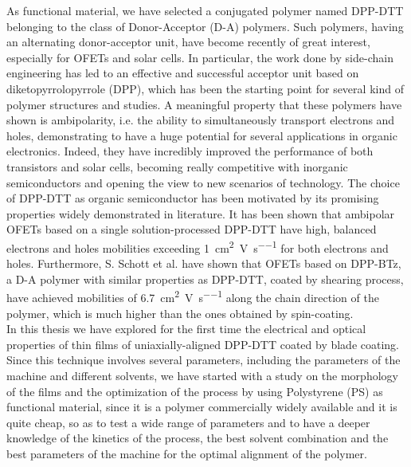 \documentclass  [
  paper    = a4,
  BCOR     = 10mm,
  twoside,
  fontsize = 12pt,
  fleqn,
  toc      = bibnumbered,
  toc      = listofnumbered,
  numbers  = noendperiod,
  headings = normal,
  listof   = leveldown,
  version  = 3.03
]                                       {scrreprt}
\begin{document}
As functional material, we have selected a conjugated polymer named DPP-DTT belonging to the class of Donor-Acceptor (D-A) polymers. Such polymers, having an alternating donor-acceptor unit, have become recently of great interest, especially for OFETs and solar cells. In particular, the work done by side-chain engineering has led to an effective and successful acceptor unit based on diketopyrrolopyrrole (DPP), which has been the starting point for several kind of polymer structures and studies\cite{art:DA}. A meaningful property that these polymers have shown is ambipolarity, i.e. the ability to simultaneously transport electrons and holes, demonstrating to have a huge potential for several applications in organic electronics. Indeed, they have incredibly improved the performance of both transistors and solar cells, becoming really competitive with inorganic semiconductors and opening the view to new scenarios of technology. The choice of DPP-DTT as organic semiconductor has been motivated by its promising properties widely demonstrated in literature. It has been shown that ambipolar OFETs based on a single solution-processed DPP-DTT have high, balanced electrons and holes mobilities exceeding \SI{1}{\square\centi\metre\per\volt\per\second} for both electrons and holes\cite{art:dppmob}\cite{art:dppmob2017}. Furthermore, S. Schott et al.\cite{art:DPPBTz} have shown that OFETs based on DPP-BTz, a D-A polymer with similar properties as DPP-DTT\cite{art:dppmob2017}, coated by shearing process, have achieved mobilities of \SI{6.7}{\square\centi\metre\per\volt\per\second} along the chain direction of the polymer, which is much higher than the ones obtained by spin-coating\cite{art:dppmobSC}.\\

In this thesis we have explored for the first time the electrical and optical properties of thin films of uniaxially-aligned DPP-DTT coated by blade coating. Since this technique involves several parameters, including the parameters of the machine and different solvents, we have started with a study on the morphology of the films and the optimization of the process by using Polystyrene (PS) as functional material, since it is a polymer commercially widely available and it is quite cheap, so as to test a wide range of parameters and to have a deeper knowledge of the kinetics of the process, the best solvent combination and the best parameters of the machine for the optimal alignment of the polymer.\\
\end{document}

